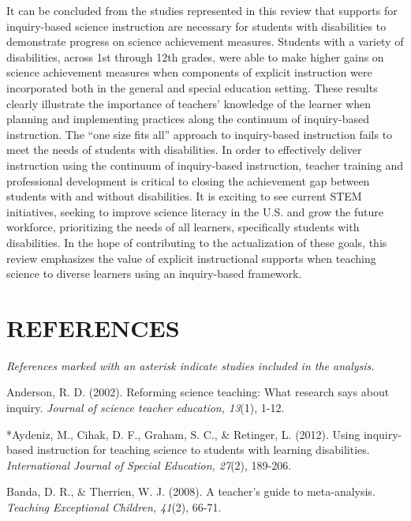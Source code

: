 \documentclass[11.5pt]{sig-alternate} %
\begin{document}
\begin{large}
It can be concluded from the studies represented in this review that supports for inquiry-based science instruction are necessary for students with disabilities to demonstrate progress on science achievement measures.  Students with a variety of disabilities, across 1st through 12th grades, were able to make higher gains on science achievement measures when components of explicit instruction were incorporated both in the general and special education setting.  These results clearly illustrate the importance of teachers’ knowledge of the learner when planning and implementing practices along the continuum of inquiry-based instruction.  The “one size fits all” approach to inquiry-based instruction fails to meet the needs of students with disabilities.  In order to effectively deliver instruction using the continuum of inquiry-based instruction, teacher training and professional development is critical to closing the achievement gap between students with and without disabilities.  It is exciting to see current STEM initiatives, seeking to improve science literacy in the U.S. and grow the future workforce, prioritizing the needs of all learners, specifically students with disabilities.  In the hope of contributing to the actualization of these goals, this review emphasizes the value of explicit instructional supports when teaching science to diverse learners using an inquiry-based framework.  

\end{large}
\clearpage
\section*{REFERENCES}\par 

\textit{References marked with an asterisk indicate studies included in the analysis.}

\leftskip 0.25in
\parindent -0.25in 

Anderson, R. D. (2002). Reforming science teaching: What research says about inquiry. \textit{Journal of science teacher education, 13}(1), 1-12.

*Aydeniz, M., Cihak, D. F., Graham, S. C., \& Retinger, L. (2012). Using inquiry-based instruction for teaching science to students with learning disabilities.  \textit{International Journal of Special Education, 27}(2), 189-206.

Banda, D. R., \& Therrien, W. J. (2008). A teacher's guide to meta-analysis. \textit{Teaching Exceptional Children, 41}(2), 66-71.
\end{document}

